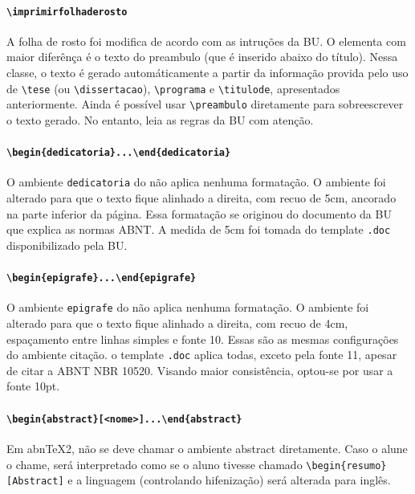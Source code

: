 \documentclass[embeddedlogo]{ufsc-thesis-rn46-2019}
\newcommand{\lacmd}[1]{\texttt{\textbackslash{}#1}}
\newcommand{\laenv}[1]{\texttt{\textbackslash{}begin\{#1\}...\textbackslash{}end\{#1\}}}
\newcommand{\laenvi}[2]{\texttt{\textbackslash{}begin\{#1\}[#2]...\textbackslash{}end\{#1\}}}
\begin{document}
\paragraph*{\lacmd{imprimirfolhaderosto}} A folha de rosto foi modifica de
acordo com as intruções da BU. O elementa com maior diferênça é o texto do
preambulo (que é inserido abaixo do título). Nessa classe, o texto é gerado
automáticamente a partir da informação provida pelo uso de \lacmd{tese} (ou
\lacmd{dissertacao}), \lacmd{programa} e \lacmd{titulode}, apresentados
anteriormente. Ainda é possível usar \lacmd{preambulo} diretamente para
sobreescrever o texto gerado. No entanto, leia as regras da BU com atenção.

\paragraph*{\laenv{dedicatoria}}
O ambiente \texttt{dedicatoria} do \abnTeX não aplica nenhuma formatação. O
ambiente foi alterado para que o texto fique alinhado a direita, com recuo de
5cm, ancorado na parte inferior da página. Essa formatação se originou do
documento da BU que explica as normas ABNT. A medida de 5cm foi tomada do
template \texttt{.doc} disponibilizado pela BU.

\paragraph*{\laenv{epigrafe}}
O ambiente \texttt{epigrafe} do \abnTeX não aplica nenhuma formatação. O
ambiente foi alterado para que o texto fique alinhado a direita, com recuo de
4cm, espaçamento entre linhas simples e fonte 10. Essas são as mesmas
configurações do ambiente citação. o template \texttt{.doc} aplica todas, exceto
pela fonte 11, apesar de citar a ABNT NBR 10520. Visando maior consistência,
optou-se por usar a fonte 10pt.

\paragraph*{\laenvi{abstract}{<nome>}}
Em abnTeX2, não se deve chamar o ambiente abstract diretamente. Caso o alune o
chame, será interpretado como se o aluno tivesse chamado
\lacmd{begin\{resumo\}[Abstract]} e a linguagem (controlando hifenização) será
alterada para inglês.
\end{document}
